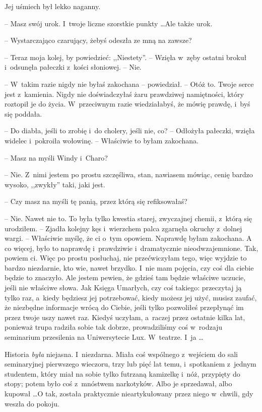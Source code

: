 \documentclass[oneside,polish,11pt,rmheadings]{mwbk}
\begin{document}
Jej uśmiech był lekko naganny. 

-- Masz swój urok. I~twoje liczne szorstkie punkty  \ldots  Ale także urok. 

-- Wystarczająco czarujący, żebyś odeszła ze mną na zawsze? 

-- Teraz moja kolej, by powiedzieć: ,,Niestety''. -- Wzięła w~zęby ostatni brokuł i~odsunęła pałeczki z~kości słoniowej. -- Nie. 

-- W~takim razie nigdy nie byłaś zakochana -- powiedział. -- Otóż to. Twoje serce jest z~kamienia. Nigdy nie doświadczyłaś żaru prawdziwej namiętności, który roztopił je do życia. W~przeciwnym razie wiedziałabyś, że mówię prawdę, i~byś się poddała. 

-- Do diabła, jeśli to zrobię i~do cholery, jeśli nie, co? -- Odłożyła pałeczki, wzięła widelec i~pokroiła wołowinę. -- Właściwie to byłam zakochana. 

-- Masz na myśli Windy i~Charo? 

-- Nie. Z~nimi jestem po prostu szczęśliwa, stan, nawiasem mówiąc, cenię bardzo wysoko, ,,zwykły'' taki, jaki jest. 

-- Czy masz na myśli tę panią, przez którą się refiksowałaś? 

-- Nie. Nawet nie to. To była tylko kwestia starej, zwyczajnej chemii, z~którą się urodziłem. -- Zjadła kolejny kęs i~wierzchem palca zgarnęła okruchy z~dolnej wargi. -- Właściwie myślę, że ci o~tym opowiem. Naprawdę byłam zakochana. A co więcej, było to naprawdę i~prawdziwie i~dramatycznie nieodwzajemnione. Tak, powiem ci. Więc po prostu posłuchaj, nie przećwiczyłam tego, więc wyjdzie to bardzo niezdarnie, kto wie, nawet brzydko. I~nie mam pojęcia, czy coś dla ciebie będzie to znaczyło. Ale jestem pewien, że gdzieś tam będzie właściwe uczucie, jeśli nie właściwe słowa. Jak Księga Umarłych, czy coś takiego: przeczytaj ją tylko raz, a~kiedy będziesz jej potrzebować, kiedy możesz jej użyć, musisz zaufać, że niezbędne informacje wrócą do Ciebie, jeśli tylko pozwoliłeś przepłynąć im przez twoje uszy nawet raz. Kiedyś uczyłam, a~raczej przez ostatnie kilka lat, ponieważ trupa radziła sobie tak dobrze, prowadziliśmy coś w~rodzaju seminarium przesilenia na Uniwersytecie Lux. W~teatrze. I~ja \ldots   

Historia \textit{była }niejasna. I~niezdarna. Miała coś wspólnego z~wejściem do sali seminaryjnej pierwszego wieczoru, trzy lub pięć lat temu, i~spotkaniem z~jednym studentem, który miał na sobie tylko futrzaną kamizelkę i~nóż, przypięty do stopy; potem było coś z~mnóstwem narkotyków. Albo je sprzedawał, albo kupował \ldots  O tak, została praktycznie nieartykułowany przez niego w~chwili, gdy weszła do pokoju. 
\end{document}
